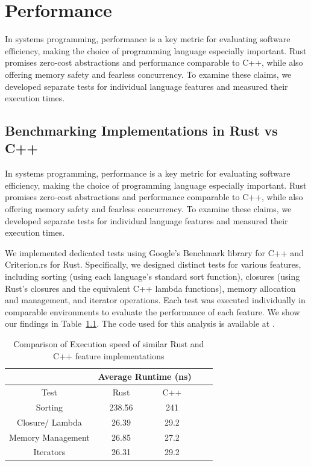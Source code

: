 \chapter{Performance}
\label{chap:performance}

In systems programming, performance is a key metric for evaluating software efficiency, making the choice of programming language especially important. Rust promises zero-cost abstractions and performance comparable to C++, while also offering memory safety and fearless concurrency. To examine these claims, we developed separate tests for individual language features and measured their execution times.

\section{Benchmarking Implementations in Rust vs C++}

In systems programming, performance is a key metric for evaluating software efficiency, making the choice of programming language especially important. Rust promises zero-cost abstractions and performance comparable to C++, while also offering memory safety and fearless concurrency. To examine these claims, we developed separate tests for individual language features and measured their execution times.

We implemented dedicated tests using Google’s Benchmark \cite[]{GoogleBenchmark2025} library for C++ and Criterion.rs \cite[]{heislerBheislerCriterionrs2025} for Rust. Specifically, we designed distinct tests for various features, including sorting (using each language’s standard sort function), closures (using Rust’s closures and the equivalent C++ lambda functions), memory allocation and management, and iterator operations. Each test was executed individually in comparable environments to evaluate the performance of each feature. We show our findings in Table~\ref{tab:comp_1}. The code used for this analysis is available at \cite[]{sColfrozenlIquidBenchmark2025}.

\begin{table}[H]
    \centering
    \begin{tabular}{|c|c|c|c|c|}
        \hline
        & \multicolumn{2}{c|}{Average Runtime (ns)} \\  
        \hline
        Test & Rust & C++ \\
        \hline
        Sorting & 238.56 & 241 \\
        Closure/ Lambda & 26.39 & 29.2 \\
        Memory Management & 26.85 & 27.2 \\
        Iterators & 26.31 & 29.2 \\
        \hline
    \end{tabular}
    \caption{Comparison of Execution speed of similar Rust and C++ feature implementations}
    \label{tab:comp_1}
\end{table}

